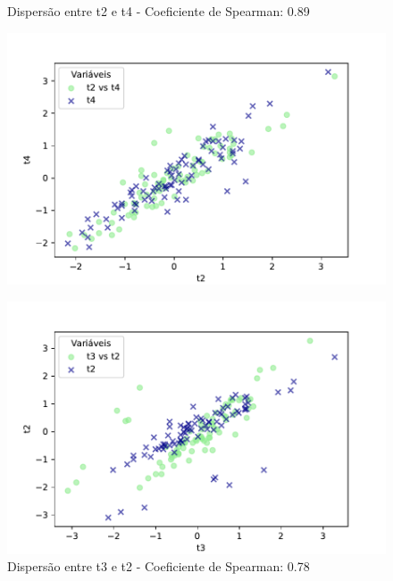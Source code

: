 \begin{figure}[h]
    \captionsetup{font=footnotesize, justification=centering, labelsep=period, position=above}
    \centering
    \begin{minipage}[b]{0.45\linewidth}
        \caption{Dispersão entre t2 e t4 - Coeficiente de Spearman: 0.89}
        \label{fig:t2-t4}
        \centering
        \includegraphics[scale=0.49]{figuras/Spearman/t2-t4.pdf}
        \vspace{0.3cm}
        \begin{minipage}{\linewidth}
            \centering
        \end{minipage}
    \end{minipage}
    \hspace{0.05\linewidth}
    \begin{minipage}[b]{0.45\linewidth}
        \caption{Dispersão entre t3 e t2 - Coeficiente de Spearman: 0.78}
        \label{fig:t3-t2}
        \centering
        \includegraphics[scale=0.35]{figuras/Spearman/t3-t2.pdf}

\end{minipage}
\end{figure}
